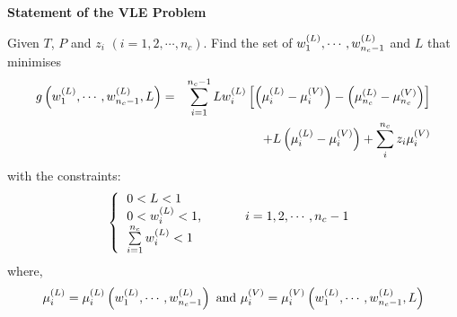\begin{shaded}
   \begin{center}
     {\bf Statement of the VLE Problem}
   \end{center}

   Given $T$, $P$ and $z_{i}$ $\left(i=1,2,\cdots,n_{c}\right)$. Find the set of $\mfr[w]{1}{L},\cdots,\mfr[w]{n_{c}-1}{L}$ and $L$ that minimises
   \begin{eqnarray}
      g\left(\mfr[w]{1}{L},\cdots,\mfr[w]{n_{c}-1}{L}, L\right) &=& \summation_{i=1}^{n_{c}-1}L\mfr[w]{i}{L}\left[\left(\mfr[\mu]{i}{L}-\mfr[\mu]{i}{V}\right)-\left(\mfr[\mu]{n_{c}}{L}-\mfr[\mu]{n_{c}}{V}\right)\right] \nonumber\\
         && + L\left(\mfr[\mu]{i}{L}-\mfr[\mu]{i}{V}\right) + \summation_{i}^{n_{c}}z_{i}\mfr[\mu]{i}{V} 
   \end{eqnarray}
   with the constraints:
\[ 
\left\{
  \begin{tabular}{l}
  $0 < L < 1$ \\
  $0 < \mfr[w]{i}{L} < 1$, \hspace{1cm} $i=1,2,\cdots,n_{c}-1$\\
  $\summation_{i=1}^{n_{c}}\mfr[w]{i}{L} < 1$\\ 
  \end{tabular}
\right.
\]
where,
\begin{displaymath}
   \mfr[\mu]{i}{L}=\mfr[\mu]{i}{L}\left(\mfr[w]{1}{L},\cdots,\mfr[w]{n_{c}-1}{L}\right)\text{ and }\mfr[\mu]{i}{V}=\mfr[\mu]{i}{V}\left(\mfr[w]{1}{L},\cdots,\mfr[w]{n_{c}-1}{L}, L\right)
\end{displaymath}

\end{shaded}
